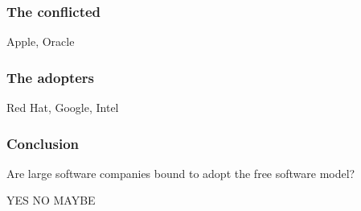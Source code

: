 \documentclass{beamer}
\begin{document}
\begin{frame}

  \frametitle{The conflicted}

  Apple, Oracle

\end{frame}

\begin{frame}

  \frametitle{The adopters}

  Red Hat, Google, Intel

\end{frame}

\begin{frame}

  \frametitle{Conclusion}

  \begin{block}{}
    \begin{center}Are large software companies bound to adopt the free software
    model?\end{center}
  \end{block}

  YES NO MAYBE

\end{frame}
\end{document}
